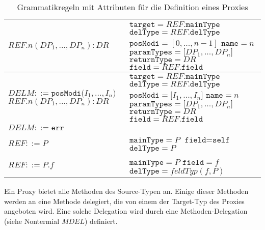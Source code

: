 \begin{table}[h!]
\begin{tabular}{|p{6cm}|p{8cm}|}
$\mathit{REF}\texttt{.}n(\mathit{DP_1},...,\mathit{DP_n}):DR $  
&
$\texttt{target} = \mathit{REF}.\texttt{mainType}$\newline
$\texttt{delType} = \mathit{REF}.\texttt{delType}$\newline
$\texttt{posModi} = [0,...,\mathit{n}-1]$\newline
$\texttt{name} = \mathit{n}$\newline
$\texttt{paramTypes} = \mathit{[DP_1},...,\mathit{DP_n]}$\newline
$\texttt{returnType} = \mathit{DR}$\newline
$\texttt{field} = \mathit{REF}\texttt{.field}$
\\
\hline
$\mathit{DELM} ::=\texttt{posModi(} \mathit{I_1},...,\mathit{I_n} \texttt{)}$\newline
$\mathit{REF}\texttt{.}n(\mathit{DP_1},...,\mathit{DP_n}):DR $  
&
$\texttt{target} = \mathit{REF}.\texttt{mainType}$\newline
$\texttt{delType} = \mathit{REF}.\texttt{delType}$\newline
$\texttt{posModi} = \mathit{[I_1},...,\mathit{I_n]}$\newline
$\texttt{name} = \mathit{n}$\newline
$\texttt{paramTypes} = \mathit{[DP_1},...,\mathit{DP_n]}$\newline
$\texttt{returnType} = \mathit{DR}$\newline
$\texttt{field} = \mathit{REF}\texttt{.field}$
\\
\hline
$\mathit{DELM} ::= \texttt{err} $  
&
\\
\hline
$\mathit{REF} ::= \mathit{P}$
& 
$\texttt{mainType} = \mathit{P}$\newline
$\texttt{field} = \texttt{self}$\newline
$\texttt{delType} = \mathit{P}$
\\
\hline
$\mathit{REF} ::= \mathit{P}\texttt{.}\mathit{f}$
&
$\texttt{mainType} = \mathit{P}$\newline
$\texttt{field} = \mathit{f}$\newline
$\texttt{delType} = \mathit{feldTyp(f,P)}$
\\
\hline
\end{tabular}
\caption{Grammatikregeln mit Attributen für die Definition eines Proxies}
 \label{tab:attrGrProxies}
\end{table}
\noindent
Ein Proxy bietet alle Methoden des Source-Typen an. Einige dieser Methoden werden an eine Methode delegiert, die von einem der Target-Typ des Proxies angeboten wird. Eine solche Delegation wird durch eine Methoden-Delegation (siehe Nontermial $\mathit{MDEL}$) definiert.
